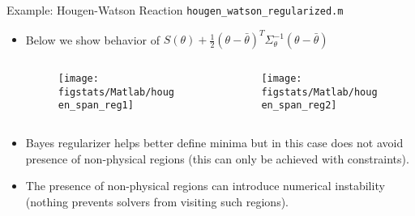\documentclass[9pt]{beamer}
\begin{document}
%
\begin{frame}{Example: Hougen-Watson Reaction \footnotesize{\texttt{hougen\_watson\_regularized.m}}}

\begin{itemize}
\setlength{\itemsep}{5pt}
\item Below we show behavior of $S(\theta)+\frac{1}{2}(\theta-\bar{\theta})^T\Sigma_\theta^{-1} (\theta -\bar{\theta})$ 
\begin{columns}
\begin{column}{0.5\textwidth}
\begin{figure}[!htb]
    \centering
	\texttt{[image: figstats/Matlab/hougen\_span\_reg1]}
\end{figure}
\end{column}
\begin{column}{0.5\textwidth}
\begin{figure}[!htb]
    \centering
	\texttt{[image: figstats/Matlab/hougen\_span\_reg2]}
\end{figure}
\end{column}
\end{columns}
\item Bayes regularizer helps better define minima but in this case does not avoid presence of non-physical regions (this can only be achieved with constraints). 
\item The presence of non-physical regions can introduce numerical instability (nothing prevents solvers from visiting such regions). 
\end{itemize}
\end{frame}
\end{document}

